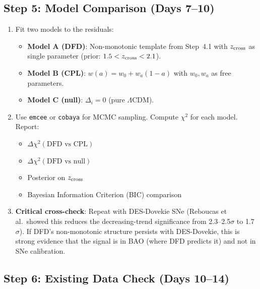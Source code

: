 \documentclass[11pt]{article}
\newcommand{\LCDM}{\Lambda\text{CDM}}
\begin{document}
\subsection{Step 5: Model Comparison (Days 7--10)}

\begin{enumerate}[label=\textbf{5.\arabic*:}, nosep]
\item Fit two models to the residuals:
  \begin{itemize}[nosep]
  \item \textbf{Model A (DFD)}: Non-monotonic template from Step~4.1
    with $z_{\rm cross}$ as single parameter (prior: $1.5 < z_{\rm cross} < 2.1$).
  \item \textbf{Model B (CPL)}: $w(a) = w_0 + w_a(1-a)$ with
    $w_0, w_a$ as free parameters.
  \item \textbf{Model C (null)}: $\Delta_i = 0$ (pure $\LCDM$).
  \end{itemize}

\item Use \texttt{emcee} or \texttt{cobaya} for MCMC sampling.
  Compute $\chi^2$ for each model. Report:
  \begin{itemize}[nosep]
  \item $\Delta\chi^2(\text{DFD vs CPL})$
  \item $\Delta\chi^2(\text{DFD vs null})$
  \item Posterior on $z_{\rm cross}$
  \item Bayesian Information Criterion (BIC) comparison
  \end{itemize}

\item \textbf{Critical cross-check}: Repeat with DES-Dovekie SNe
  (Reboucas et al.\ showed this reduces the decreasing-trend significance
  from 2.3--2.5$\sigma$ to 1.7$\sigma$). If DFD's non-monotonic structure
  persists with DES-Dovekie, this is strong evidence that the signal is
  in BAO (where DFD predicts it) and not in SNe calibration.
\end{enumerate}

\subsection{Step 6: Existing Data Check (Days 10--14)}
\end{document}
